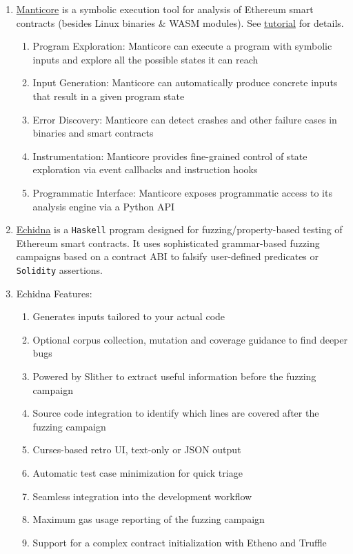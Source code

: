 \begin{enumerate}
\item\href{https://github.com/trailofbits/manticore}{Manticore} is a symbolic execution tool for analysis of Ethereum smart contracts (besides Linux binaries \& WASM modules). See \href{https://github.com/crytic/building-secure-contracts/tree/master/program-analysis/manticore}{tutorial} for details.
	\begin{enumerate}
	\item Program Exploration: Manticore can execute a program with symbolic inputs and explore all the possible states it can reach
	\item Input Generation: Manticore can automatically produce concrete inputs that result in a given program state
	\item Error Discovery: Manticore can detect crashes and other failure cases in binaries and smart contracts
	\item Instrumentation: Manticore provides fine-grained control of state exploration via event callbacks and instruction hooks
	\item Programmatic Interface: Manticore exposes programmatic access to its analysis engine via a Python API
	\end{enumerate}

\item\href{https://github.com/crytic/echidna}{Echidna} is a \verb|Haskell| program designed for fuzzing/property-based testing of Ethereum smart contracts. It uses sophisticated grammar-based fuzzing campaigns based on a contract ABI to falsify user-defined predicates or \verb|Solidity| assertions.

\item Echidna Features:
	\begin{enumerate}
	\item Generates inputs tailored to your actual code
	\item Optional corpus collection, mutation and coverage guidance to find deeper bugs
	\item Powered by Slither to extract useful information before the fuzzing campaign
	\item Source code integration to identify which lines are covered after the fuzzing campaign
	\item Curses-based retro UI, text-only or JSON output
	\item Automatic test case minimization for quick triage
	\item Seamless integration into the development workflow
	\item Maximum gas usage reporting of the fuzzing campaign
	\item Support for a complex contract initialization with Etheno and Truffle
	\end{enumerate}


\end{enumerate}
